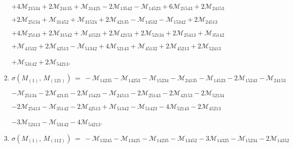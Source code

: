 \documentclass[12pt]{article}
\newcommand{\M}{\mathcal{M}}
\begin{document}
\begin{enumerate}
      \hspace{10pt}
      $+4\M_{21534} 
       +2\M_{24135} +\M_{31425} 
       -2\M_{13542} -\M_{14523} 
       +6\M_{21543} +2\M_{24153} $\vspace{-6pt}

      \hspace{10pt}
      $+2\M_{25134} +\M_{31452} 
       +\M_{31524} +2\M_{42135} 
       -\M_{14532} -\M_{15342} 
       +2\M_{24513} $\vspace{-6pt}

      \hspace{10pt}
      $+4\M_{25143} 
       +2\M_{31542} +\M_{41523} 
       +2\M_{42153} +2\M_{52134} 
       +2\M_{25413} +\M_{35142} $\vspace{-6pt}

      \hspace{10pt}
      $+\M_{41532} +2\M_{42513} 
       -\M_{51342} +4\M_{52143} 
       +\M_{45132} +2\M_{45213} 
       +2\M_{52413} $\vspace{-6pt}

      \hspace{10pt}
      $+\M_{53142} 
       +2\M_{54213} $.\vspace{-8pt}
\item[]\hspace{-50pt}$\sigma(M_{(1)},\,M_{(121)})\ =\ 
        -\M_{14235} -\M_{14253} 
       -\M_{15234} -\M_{24135} 
       -\M_{14523} -2\M_{15243} 
       -\M_{24153} $\vspace{-6pt}

      \hspace{10pt}
      $-\M_{25134} 
       -2\M_{42135} -2\M_{15423} 
       -\M_{24513} -2\M_{25143} 
       -2\M_{42153} -2\M_{52134} $\vspace{-6pt}

      \hspace{10pt}
      $-2\M_{25413} -\M_{35142} 
       -2\M_{42513} +\M_{51342} 
       -\M_{51423} -4\M_{52143} 
       -2\M_{45213} $\vspace{-6pt}

      \hspace{10pt}
      $-3\M_{52413} 
       -\M_{53142} -4\M_{54213} $.\vspace{-8pt}
\item[]\hspace{-50pt}$\sigma(M_{(1)},\,M_{(112)})\ =\ 
        -\M_{13245} -\M_{13425} 
       -\M_{14235} -\M_{13452} 
       -3\M_{14325} -\M_{15234} 
       -2\M_{14352} $\vspace{-6pt}


\end{enumerate}
\end{document}
